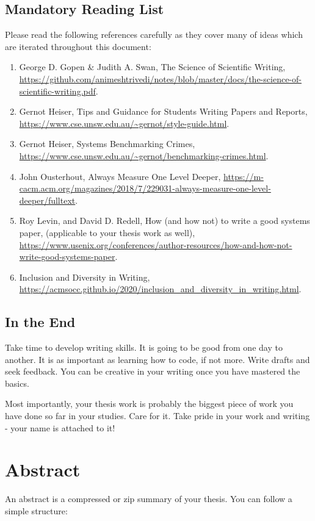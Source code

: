 \documentclass[11pt]{article}
\begin{document}
\subsection*{Mandatory Reading List}
Please read the following references carefully as they cover many of ideas which are iterated throughout this document:  
\begin{enumerate}
    \item George D. Gopen \& Judith A. Swan, The Science of Scientific Writing, \url{https://github.com/animeshtrivedi/notes/blob/master/docs/the-science-of-scientific-writing.pdf}. 
    \item Gernot Heiser, Tips and Guidance for Students Writing Papers and Reports, \url{https://www.cse.unsw.edu.au/~gernot/style-guide.html}. 
    \item Gernot Heiser, Systems Benchmarking Crimes, \url{https://www.cse.unsw.edu.au/~gernot/benchmarking-crimes.html}. 
    \item John Ousterhout, Always Measure One Level Deeper, \url{https://m-cacm.acm.org/magazines/2018/7/229031-always-measure-one-level-deeper/fulltext}. 
    \item Roy Levin, and David D. Redell,  How (and how not) to write a good systems paper, (applicable to your thesis work as well), \url{https://www.usenix.org/conferences/author-resources/how-and-how-not-write-good-systems-paper}.
    \item Inclusion and Diversity in Writing, \url{https://acmsocc.github.io/2020/inclusion_and_diversity_in_writing.html}. 
\end{enumerate}
\subsection*{In the End}
Take time to develop writing skills. It is going to be good from one day to another. It is as important as learning how to code, if not more. Write drafts and seek feedback. You can be creative in your writing once you have mastered the basics. 

Most importantly, your thesis work is probably the biggest piece of work you have done so far in your studies. Care for it. Take pride in your work and writing - your name is attached to it! 

\newpage
\section{Abstract}
An abstract is a compressed or zip summary of your thesis. You can follow a simple structure:
\end{document}
